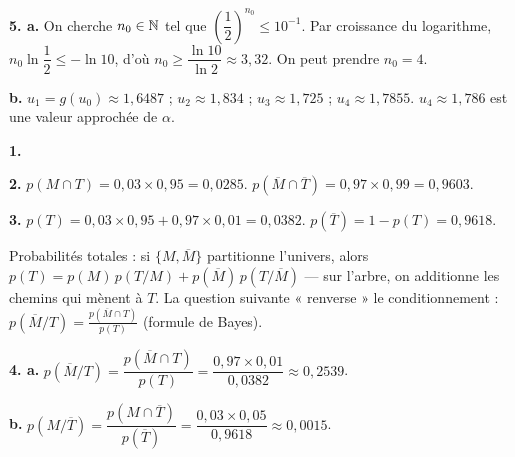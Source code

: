 \documentclass[11pt]{article}
\begin{document}
\textbf{5. a.} On cherche $n_0 \in \mathbb{N}$ tel que $\left(\dfrac{1}{2}\right)^{n_0} \le 10^{-1}$. Par croissance du logarithme, $n_0\ln\dfrac{1}{2} \le -\ln 10$, d'où $n_0 \ge \dfrac{\ln 10}{\ln 2} \approx 3{,}32$. On peut prendre $n_0 = 4$.

\textbf{b.} $u_1 = g(u_0) \approx 1{,}6487$ ; $u_2 \approx 1{,}834$ ; $u_3 \approx 1{,}725$ ; $u_4 \approx 1{,}7855$. $u_4 \approx 1{,}786$ est une valeur approchée de $\alpha$.


\textbf{1.} \begin{center}
\end{center}

\textbf{2.} $p(M \cap T) = 0{,}03 \times 0{,}95 = 0{,}0285$. \quad $p(\overline{M} \cap \overline{T}) = 0{,}97 \times 0{,}99 = 0{,}9603$.

\textbf{3.} $p(T) = 0{,}03 \times 0{,}95 + 0{,}97 \times 0{,}01 = 0{,}0382$. \quad $p(\overline{T}) = 1 - p(T) = 0{,}9618$.

\begin{rappel}
Probabilités totales : si $\{M, \overline{M}\}$ partitionne l'univers,
alors $p(T) = p(M)\,p(T/M) + p(\overline{M})\,p(T/\overline{M})$ — sur
l'arbre, on additionne les chemins qui mènent à $T$. La question
suivante « renverse » le conditionnement :
$p(\overline{M}/T) = \frac{p(\overline{M} \cap T)}{p(T)}$
(formule de Bayes).
\end{rappel}

\textbf{4. a.} $p(\overline{M}/T) = \dfrac{p(\overline{M} \cap T)}{p(T)} = \dfrac{0{,}97 \times 0{,}01}{0{,}0382} \approx 0{,}2539$.

\textbf{b.} $p(M/\overline{T}) = \dfrac{p(M \cap \overline{T})}{p(\overline{T})} = \dfrac{0{,}03 \times 0{,}05}{0{,}9618} \approx 0{,}0015$.
\end{document}

